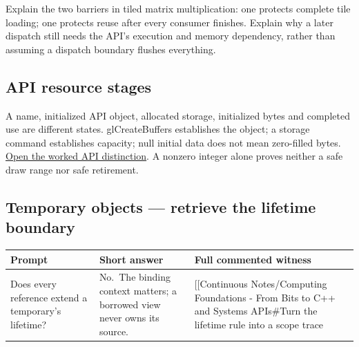 Explain the two barriers in tiled matrix multiplication: one protects complete tile loading; one protects reuse after every consumer finishes. Explain why a later dispatch still needs the API's execution and memory dependency, rather than assuming a dispatch boundary flushes everything.

\subsection{API resource stages}\label{appendix-960160274237-api-resource-stages}

A name, initialized API object, allocated storage, initialized bytes and completed use are different states. glCreateBuffers establishes the object; a storage command establishes capacity; null initial data does not mean zero-filled bytes. \hyperref[01-foundations-i-ch008-a-buffer-name-an-api-object-and-its-storage-are-separate]{Open the worked API distinction}. A nonzero integer alone proves neither a safe draw range nor safe retirement.

\subsection{Temporary objects --- retrieve the lifetime boundary}\label{appendix-960160274237-temporary-objects-retrieve-the-lifetime-boundary}

{\def\LTcaptype{none} %
\begin{longtable}[]{@{}
  >{\raggedright\arraybackslash}p{}
  >{\raggedright\arraybackslash}p{}
  >{\raggedright\arraybackslash}p{}@{}}
\toprule\noalign{}
\begin{minipage}[b]{\linewidth}\raggedright
Prompt
\end{minipage} & \begin{minipage}[b]{\linewidth}\raggedright
Short answer
\end{minipage} & \begin{minipage}[b]{\linewidth}\raggedright
Full commented witness
\end{minipage} \\
\midrule\noalign{}
\endhead
\bottomrule\noalign{}
\endlastfoot
Does every reference extend a temporary's lifetime? & No.~The binding context matters; a borrowed view never owns its source. & {[}{[}Continuous Notes/Computing Foundations - From Bits to C++ and Systems APIs\#Turn the lifetime rule into a scope trace \\
\end{longtable}
}

